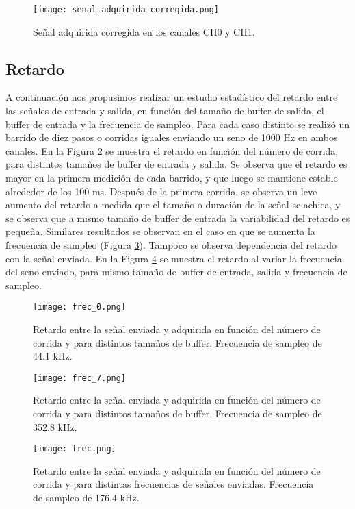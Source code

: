 \documentclass[a4paper, 11pt]{article}
\begin{document}
\begin{figure} [H]
\centering
\texttt{[image: senal\_adquirida\_corregida.png]}
\caption{Señal adquirida corregida en los canales CH0 y CH1. \label{fig:senal_adquirida_corregida}}
\end{figure} 

\subsection*{Retardo}
A continuación nos propusimos realizar un estudio estadístico del retardo entre las señales de entrada y salida, en función del tamaño de buffer de salida, el buffer de entrada y la frecuencia de sampleo. Para cada caso distinto se realizó un barrido de diez pasos o corridas iguales enviando un seno de 1000 Hz en ambos canales. En la Figura \ref{fig:frec_0} se muestra el retardo en función del número de corrida, para distintos tamaños de buffer de entrada y salida. Se observa que el retardo es mayor en la primera medición de cada barrido, y que luego se mantiene estable alrededor de los 100 ms. Después de la primera corrida, se observa un leve aumento del retardo a medida que el tamaño o duración de la señal se achica, y se observa que a mismo tamaño de buffer de entrada la variabilidad del retardo es pequeña. Similares resultados se observan en el caso en que se aumenta la frecuencia de sampleo (Figura \ref{fig:frec_7}). 
Tampoco se observa dependencia del retardo con la señal enviada. En la Figura \ref{fig:frec} se muestra el retardo al variar la frecuencia del seno enviado, para mismo tamaño de buffer de entrada, salida y frecuencia de sampleo.
 
\begin{figure} [H]
\centering
\texttt{[image: frec\_0.png]}
\caption{Retardo entre la señal enviada y adquirida en función del número de corrida y para distintos tamaños de buffer. Frecuencia de sampleo de 44.1 kHz. \label{fig:frec_0}}
\end{figure} 
 
\begin{figure} [H]
\centering
\texttt{[image: frec\_7.png]}
\caption{Retardo entre la señal enviada y adquirida en función del número de corrida y para distintos tamaños de buffer. Frecuencia de sampleo de 352.8 kHz.  \label{fig:frec_7}}
\end{figure} 
 
\begin{figure} [H]
\centering
\texttt{[image: frec.png]}
\caption{Retardo entre la señal enviada y adquirida en función del número de corrida y para distintas frecuencias de señales enviadas. Frecuencia de sampleo de 176.4 kHz.  \label{fig:frec}}
\end{figure} 
\end{document}
